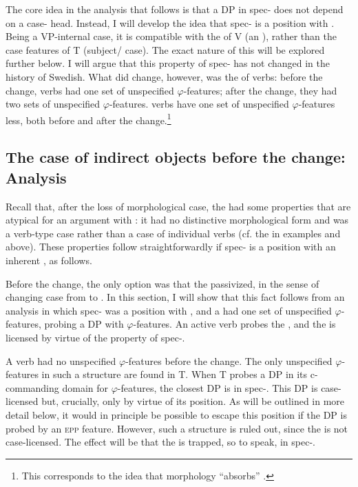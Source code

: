 \documentclass[output=paper]{langscibook}
\begin{document}
The core idea in the analysis that follows is that a DP in spec- does not depend on a case- head. Instead, I will develop the idea that spec- is a position with . Being a VP-internal case, it is compatible with the  of V (an ), rather than the case features of T (subject/ case). The exact nature of this  will be explored further below. I will argue that this property of spec- has not changed in the history of Swedish. What did change, however, was the  of  verbs: before the change,  verbs had one set of unspecified $\varphi ${}-features; after the change, they had two sets of unspecified $\varphi $-features.  verbs have one set of unspecified $\varphi ${}-features less, both before and after the change.\footnote{This corresponds to the idea that  morphology “absorbs” .}


\subsection{The case of indirect objects before the change: Analysis}\label{sec:falk:4.2}


Recall that, after the loss of morphological case, the  had some properties that are atypical for an argument with : it had no distinctive morphological form and was a verb-type case rather than a case of individual verbs (cf. the  in examples  and  above). These properties follow straightforwardly if spec- is a position with an inherent , as follows.


Before the change, the only option was that the  passivized, in the sense of changing case from  to . In this section, I will show that this fact follows from an analysis in which spec- was a position with , and a  had one set of unspecified $\varphi ${}-features, probing a DP with $\varphi $-features. An active verb probes the , and the  is licensed by virtue of the  property of spec-. 



A  verb had no unspecified $\varphi $-features before the change. The only unspecified $\varphi $-features in such a structure are found in T. When T probes a DP in its c-commanding domain for $\varphi $-features, the closest DP is in spec-. This DP is case-licensed but, crucially, only by virtue of its position. As will be outlined in more detail below, it would in principle be possible to escape this position if the  DP is probed by an \textsc{epp} feature. However, such a structure is ruled out, since the  is not case-licensed. The effect will be that the  is trapped, so to speak, in spec-. 
\end{document}
